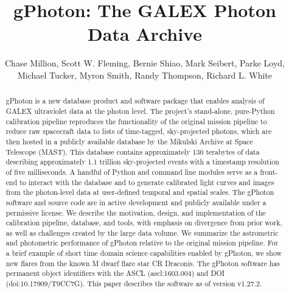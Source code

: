 \documentclass[iop]{emulateapj}
\begin{document}
\title{gPhoton: The GALEX Photon Data Archive}

\author{
  Chase Million,
  Scott W. Fleming,
  Bernie Shiao,
  Mark Seibert,
  Parke Loyd,
  Michael Tucker,
  Myron Smith,
  Randy Thompson,
  Richard L. White
}



\begin{abstract}
gPhoton is a new database product and software package that enables analysis of GALEX ultraviolet data at the photon level. The project's stand-alone, pure-Python calibration pipeline reproduces the functionality of the original mission pipeline to reduce raw spacecraft data to lists of time-tagged, sky-projected photons, which are then hosted in a publicly available database by the Mikulski Archive at Space Telescope (MAST). This database contains approximately 130 terabytes of data describing approximately 1.1 trillion sky-projected events with a timestamp resolution of five milliseconds. A handful of Python and command line modules serve as a front-end to interact with the database and to generate calibrated light curves and images from the photon-level data at user-defined temporal and spatial scales. The gPhoton software and source code are in active development and publicly available under a permissive license. We describe the motivation, design, and implementation of the calibration pipeline, database, and tools, with emphasis on divergence from prior work, as well as challenges created by the large data volume. We summarize the astrometric and photometric performance of gPhoton relative to the original mission pipeline. For a brief example of short time domain science capabilities enabled by gPhoton, we show new flares from the known M dwarf flare star CR Draconis. The gPhoton software has permanent object identifiers with the ASCL (ascl:1603.004) and DOI (doi:10.17909/T9CC7G).  This paper describes the software as of version v1.27.2.
\end{abstract}
\end{document}

